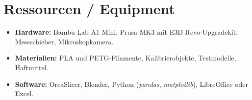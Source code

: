 \chapter{Ressourcen / Equipment}
\label{cha:Ressourcen / Equipment}

\begin{itemize}
  \item \textbf{Hardware:} Bambu Lab A1 Mini, Prusa MK3 mit E3D Revo-Upgradekit, Messschieber, Mikroskopkamera.  
  \item \textbf{Materialien:} PLA und PETG-Filamente, Kalibrierobjekte, Testmodelle, Haftmittel.  
  \item \textbf{Software:} OrcaSlicer, Blender, Python (\textit{pandas}, \textit{matplotlib}), LibreOffice oder Excel.  
\end{itemize}
